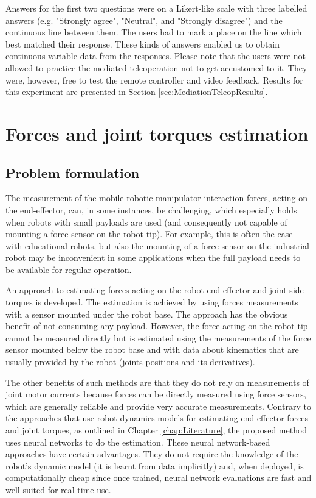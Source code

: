 Answers for the first two questions were on a Likert-like scale with three labelled answers (e.g. "Strongly agree", "Neutral", and "Strongly disagree") and the continuous line between them. The users had to mark a place on the line which best matched their response. These kinds of answers enabled us to obtain continuous variable data from the responses. Please note that the users were not allowed to practice the mediated teleoperation not to get accustomed to it. They were, however, free to test the remote controller and video feedback. Results for this experiment are presented in Section \ref{sec:MediationTeleopResults}.

\section{Forces and joint torques estimation}
\label{sec:MMForceEstimation}

\subsection{Problem formulation}

The measurement of the mobile robotic manipulator interaction forces, acting on the end-effector, can, in some instances, be challenging, which especially holds when robots with small payloads are used (and consequently not capable of mounting a force sensor on the robot tip). For example, this is often the case with educational robots, but also the mounting of a force sensor on the industrial robot may be inconvenient in some applications when the full payload needs to be available for regular operation.

An approach to estimating forces acting on the robot end-effector and joint-side torques is developed. The estimation is achieved by using forces measurements with a sensor mounted under the robot base. The approach has the obvious benefit of not consuming any payload. However, the force acting on the robot tip cannot be measured directly but is estimated using the measurements of the force sensor mounted below the robot base and with data about kinematics that are usually provided by the robot (joints positions and its derivatives).

The other benefits of such methods are that they do not rely on measurements of joint motor currents because forces can be directly measured using force sensors, which are generally reliable and provide very accurate measurements. Contrary to the approaches that use robot dynamics models for estimating end-effector forces and joint torques, as outlined in Chapter \ref{chap:Literature}, the proposed method uses neural networks to do the estimation. These neural network-based approaches have certain advantages. They do not require the knowledge of the robot's dynamic model (it is learnt from data implicitly) and, when deployed, is computationally cheap since once trained, neural network evaluations are fast and well-suited for real-time use.

